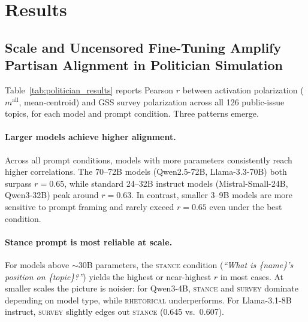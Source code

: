 \section{Results}
\label{sec:results}

\subsection{Scale and Uncensored Fine-Tuning Amplify Partisan Alignment in Politician Simulation}
\label{sec:results_politician}

Table~\ref{tab:politician_results} reports Pearson $r$ between activation polarization ($m^\text{all}$, mean-centroid) and GSS survey polarization across all 126 public-issue topics, for each model and prompt condition. Three patterns emerge.

\paragraph{Larger models achieve higher alignment.}
Across all prompt conditions, models with more parameters consistently reach higher correlations. The 70--72B models (Qwen2.5-72B, Llama-3.3-70B) both surpass $r = 0.65$, while standard 24--32B instruct models (Mistral-Small-24B, Qwen3-32B) peak around $r = 0.63$. In contrast, smaller 3--9B models are more sensitive to prompt framing and rarely exceed $r = 0.65$ even under the best condition.

\paragraph{Stance prompt is most reliable at scale.}
For models above $\sim$30B parameters, the \textsc{stance} condition (\textit{``What is \{name\}'s position on \{topic\}?''}) yields the highest or near-highest $r$ in most cases. At smaller scales the picture is noisier: for Qwen3-4B, \textsc{stance} and \textsc{survey} dominate depending on model type, while \textsc{rhetorical} underperforms. For Llama-3.1-8B instruct, \textsc{survey} slightly edges out \textsc{stance} (0.645 vs.\ 0.607).

